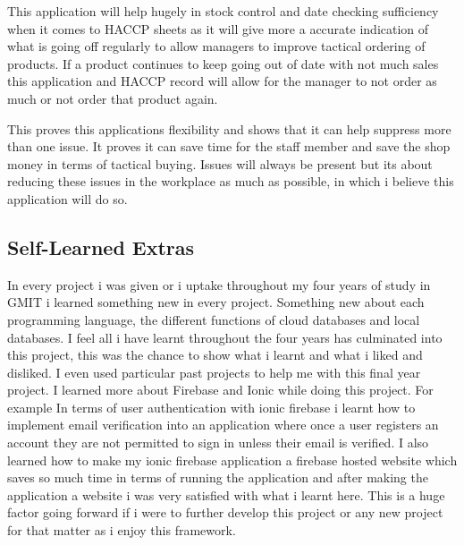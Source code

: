 This application will help hugely in stock control and date checking sufficiency when it comes to HACCP sheets as it will give more a accurate indication of what is going off regularly to allow managers to improve tactical ordering of products. If a product continues to keep going out of date with not much sales this application and HACCP record will allow for the manager to not order as much or not order that product again.
\newline

This proves this applications flexibility and shows that it can help suppress more than one issue. It proves it can save time for the staff member and save the shop money in terms of tactical buying. Issues will always be present but its about reducing these issues in the workplace as much as possible, in which i believe this application will do so. 


\subsection{Self-Learned Extras}
In every project i was given or i uptake throughout my four years of study in GMIT i learned something new in every project. Something new about each programming language, the different functions of cloud databases and local databases. I feel all i have learnt throughout the four years has culminated into this project, this was the chance to show what i learnt and what i liked and disliked. I even used particular past projects to help me with this final year project. I learned more about Firebase and Ionic while doing this project. For example In terms of user authentication with ionic firebase i learnt how to implement email verification into an application where once a user registers an account they are not permitted to sign in unless their email is verified. I also learned how to make my ionic firebase application a firebase hosted website which saves so much time in terms of running the application and after making the application a website i was very satisfied with what i learnt here. This is a huge factor going forward if i were to further develop this project or any new project for that matter as i enjoy this framework. 
